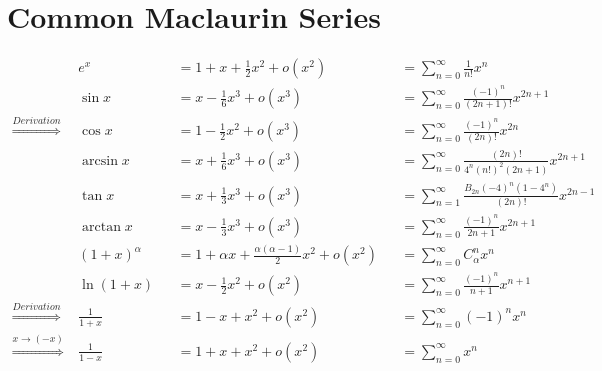 \documentclass{article}
\begin{document}
	\large
	\setlength{\baselineskip}{4em}
	
	\renewcommand{\d}[1][x]{\ \text{d}#1}
	
	\section*{Common Maclaurin Series}
	
	\begin{align}
		& e^x & & = 1 + x + \frac{1}{2} x^2 + o(x^2) && = \sum_{n = 0}^{\infty} \frac{1}{n!} x^n
		\\
		& \sin x & & = x - \frac{1}{6} x^3 + o(x^3) && = \sum_{n = 0}^{\infty} \frac{(-1)^n}{(2n + 1)!} x^{2n + 1}
		\\
		\stackrel{Derivation}{\Longrightarrow} \ & \cos x & & = 1 - \frac{1}{2} x^2 + o(x^3) && = \sum_{n = 0}^{\infty} \frac{(-1)^n}{(2n)!} x^{2n}
		\\
		& \arcsin x & & = x + \frac{1}{6} x^3 + o(x^3) && = \sum_{n = 0}^{\infty} \frac{(2n)!}{4^n (n!)^2 (2n + 1)} x^{2n + 1}
		\\
		& \tan x & & = x + \frac{1}{3} x^3 + o(x^3) && = \sum_{n = 1}^{\infty} \frac{B_{2n} (-4)^n (1 - 4^n)}{(2n)!} x^{2n - 1}
		\\
		& \arctan x & & = x - \frac{1}{3} x^3 + o(x^3) && = \sum_{n = 0}^{\infty} \frac{(-1)^n}{2n + 1} x^{2n + 1}
		\\
		& (1 + x)^\alpha & & = 1 + \alpha x + \frac{\alpha (\alpha - 1)}{2} x^2 + o(x^2) && = \sum_{n = 0}^{\infty} C_{\alpha}^{n} x^n
		\\
		& \ln{(1 + x)} & & = x - \frac{1}{2} x^2 + o(x^2) && = \sum_{n = 0}^{\infty} \frac{(-1)^n}{n + 1} x^{n + 1}
		\\
		\stackrel{Derivation}{\Longrightarrow} \ & \frac{1}{1 + x} & & = 1 - x + x^2 + o(x^2) && = \sum_{n = 0}^{\infty} (-1)^n x^n
		\\
		\stackrel{x \rightarrow (-x)}{\Longrightarrow} \ & \frac{1}{1 - x} & & = 1 + x + x^2 + o(x^2) && = \sum_{n = 0}^{\infty} x^n
	\end{align}
\end{document}
